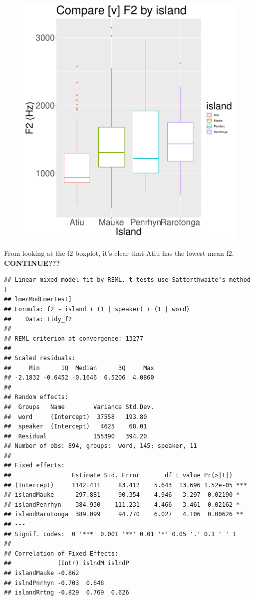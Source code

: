 \documentclass[
  ,man,floatsintext]{apa6}
\begin{document}
\begin{figure}
\includegraphics[width=2700px]{D2_CIM_files/figure-latex/print-f2-plot-1} \caption{ }\label{fig:print-f2-plot}
\end{figure}

From looking at the f2 boxplot, it's clear that Atiu has the lowest mean f2. \textbf{CONTINUE???}

\begin{verbatim}
## Linear mixed model fit by REML. t-tests use Satterthwaite's method [
## lmerModLmerTest]
## Formula: f2 ~ island + (1 | speaker) + (1 | word)
##    Data: tidy_f2
## 
## REML criterion at convergence: 13277
## 
## Scaled residuals: 
##     Min      1Q  Median      3Q     Max 
## -2.1832 -0.6452 -0.1646  0.5206  4.0860 
## 
## Random effects:
##  Groups   Name        Variance Std.Dev.
##  word     (Intercept)  37558   193.80  
##  speaker  (Intercept)   4625    68.01  
##  Residual             155390   394.20  
## Number of obs: 894, groups:  word, 145; speaker, 11
## 
## Fixed effects:
##                 Estimate Std. Error       df t value Pr(>|t|)    
## (Intercept)     1142.411     83.412    5.643  13.696 1.52e-05 ***
## islandMauke      297.881     90.354    4.946   3.297  0.02190 *  
## islandPenrhyn    384.930    111.231    4.466   3.461  0.02162 *  
## islandRarotonga  389.099     94.770    6.027   4.106  0.00626 ** 
## ---
## Signif. codes:  0 '***' 0.001 '**' 0.01 '*' 0.05 '.' 0.1 ' ' 1
## 
## Correlation of Fixed Effects:
##             (Intr) islndM islndP
## islandMauke -0.862              
## islndPnrhyn -0.703  0.648       
## islandRrtng -0.829  0.769  0.626
\end{verbatim}
\end{document}
